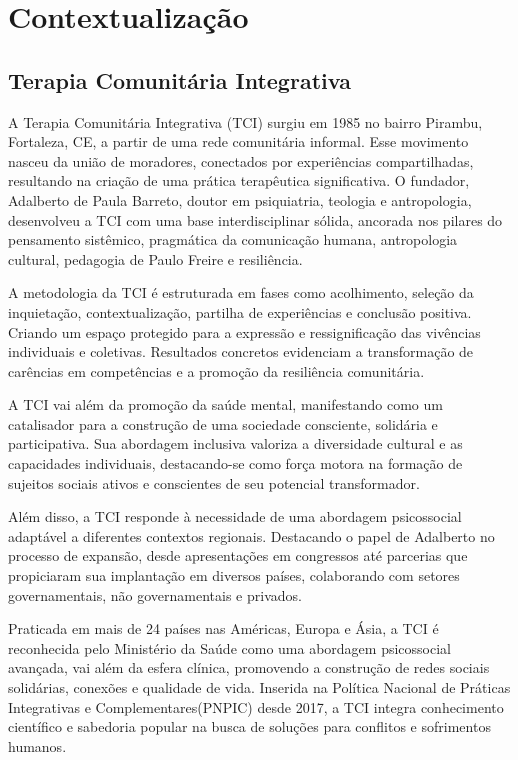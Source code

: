 \part{Contextualização}

\chapter[Terapia Comunitária Integrativa]{Terapia Comunitária Integrativa}

A Terapia Comunitária Integrativa (TCI) surgiu em 1985 no bairro Pirambu, Fortaleza, CE, a partir de uma rede comunitária informal. Esse movimento nasceu da união de moradores, conectados por experiências compartilhadas, resultando na criação de uma prática terapêutica significativa. O fundador, Adalberto de Paula Barreto, doutor em psiquiatria, teologia e antropologia, desenvolveu a TCI com uma base interdisciplinar sólida, ancorada nos pilares do pensamento sistêmico, pragmática da comunicação humana, antropologia cultural, pedagogia de Paulo Freire e resiliência.\cite{BARRETO}

A metodologia da TCI é estruturada em fases como acolhimento, seleção da inquietação, contextualização, partilha de experiências e conclusão positiva. Criando um espaço protegido para a expressão e ressignificação das vivências individuais e coletivas. Resultados concretos evidenciam a transformação de carências em competências e a promoção da resiliência comunitária. \cite{SILVA}

A TCI vai além da promoção da saúde mental, manifestando como um catalisador para a construção de uma sociedade consciente, solidária e participativa. Sua abordagem inclusiva valoriza a diversidade cultural e as capacidades individuais, destacando-se como força motora na formação de sujeitos sociais ativos e conscientes de seu potencial transformador.\cite{BARRETO}

Além disso, a TCI responde à necessidade de uma abordagem psicossocial adaptável a diferentes contextos regionais. Destacando o papel de Adalberto no processo de expansão, desde apresentações em congressos até parcerias que propiciaram sua implantação em diversos países, colaborando com setores governamentais, não governamentais e privados.\cite{GOMES}

Praticada em mais de 24 países nas Américas, Europa e Ásia, a TCI é reconhecida pelo Ministério da Saúde como uma abordagem psicossocial avançada, vai além da esfera clínica, promovendo a construção de redes sociais solidárias, conexões e qualidade de vida. Inserida na Política Nacional de Práticas Integrativas e Complementares(PNPIC) desde 2017, a TCI integra conhecimento científico e sabedoria popular na busca de soluções para conflitos e sofrimentos humanos.\cite{ABRATECOM}

